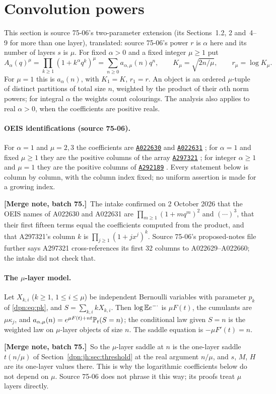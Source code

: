 \documentclass[11pt]{article}
\numberwithin{equation}{section}
\theoremstyle{definition}\newtheorem{definition}[theorem]{Definition}
\theoremstyle{remark}\newtheorem{remark}[theorem]{Remark}
\newcommand{\OEIS}[1]{\href{https://oeis.org/#1}{\texttt{#1}}}
\newcommand{\src}[1]{\textup{(source #1)}}
\newcommand{\mergenoteb}[1]{\par\smallskip\noindent\textbf{[Merge note, batch 75.]}\ #1\par\smallskip}
\begin{document}
\section{Convolution powers}\label{dpn:cp:sec:powers}
This section is source 75-06's two-parameter extension (its Sections~1.2, 2
and~4--9 for more than one layer), translated: source 75-06's power $r$ is
$\alpha$ here and its number of layers $s$ is $\mu$.  For fixed $\alpha>0$ and
a fixed integer $\mu\ge1$ put
\begin{equation}\label{dpn:cp:eq:family}
 A_\alpha(q)^\mu=\prod_{k\ge1}(1+k^\alpha q^k)^\mu=\sum_{n\ge0}a_{\alpha,\mu}(n)q^n,
 \qquad K_\mu=\sqrt{2n/\mu},\qquad r_\mu=\log K_\mu .
\end{equation}
For $\mu=1$ this is $a_\alpha(n)$, with $K_1=K$, $r_1=r$.  An object is an
ordered $\mu$-tuple of distinct partitions of total size $n$, weighted by the
product of their $\alpha$th norm powers; for integral $\alpha$ the weights
count colourings.  The analysis also applies to real $\alpha>0$, when the
coefficients are positive reals.

\paragraph{OEIS identifications \src{75-06}.}
For $\alpha=1$ and $\mu=2,3$ the coefficients are \OEIS{A022630} and
\OEIS{A022631} \cite{oeis22630}; for $\alpha=1$ and fixed $\mu\ge1$ they are
the positive columns of the array \OEIS{A297321} \cite{oeis297321}; for integer
$\alpha\ge1$ and $\mu=1$ they are the positive columns of \OEIS{A292189}
\cite{oeisarray}.  Every statement below is column by column, with the column
index fixed; no uniform assertion is made for a growing index.
\mergenoteb{The intake confirmed on 2 October 2026 that the OEIS names of
A022630 and A022631 are $\prod_{m\ge1}(1+mq^m)^2$ and $(\cdots)^3$, that their
first fifteen terms equal the coefficients computed from the product, and
that A297321's column $k$ is $\prod_{j\ge1}(1+jx^j)^k$.  Source 75-06's
proposed-notes file further says A297321 cross-references its first 32
columns to A022629--A022660; the intake did not check that.}

\paragraph{The $\mu$-layer model.}
Let $X_{k,i}$ ($k\ge1$, $1\le i\le\mu$) be independent Bernoulli variables with
parameter $p_k$ of \eqref{dpn:eq:pk}, and $S=\sum_{k,i}kX_{k,i}$.  Then
$\log\mathbb E e^{-\cdot}$ is $\mu F(t)$, the cumulants are $\mu\kappa_j$, and
$a_{\alpha,\mu}(n)=e^{\mu F(t)+nt}\mathbb P_t(S=n)$; the conditional law given
$S=n$ is the weighted law on $\mu$-layer objects of size $n$.  The saddle
equation is $-\mu F'(t)=n$.
\mergenoteb{So the $\mu$-layer saddle at $n$ is the one-layer saddle
$t(n/\mu)$ of Section~\ref{dpn:jh:sec:threshold} at the real argument $n/\mu$,
and $s$, $M$, $H$ are its one-layer values there.  This is why the logarithmic
coefficients below do not depend on $\mu$.  Source 75-06 does not phrase it
this way; its proofs treat $\mu$ layers directly.}
\end{document}
